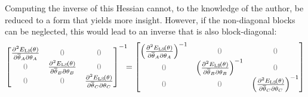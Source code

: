 \begin{remark}
Computing the inverse of this Hessian cannot, to the knowledge of the author, be reduced to a form that yields more insight.
However, if the non-diagonal blocks can be neglected, this would lead to an inverse that is also block-diagonal:
\begin{equation}
   \begin{bmatrix}
    \PartialDerivative[2]{\ELSCost{\theta}}{ \conj{\theta}_A \pd \theta_A } &
    \deemph{0} & 
    \deemph{0} \\
    \deemph{0} &
    \PartialDerivative[2]{\ELSCost{\theta}}{ \conj{\theta}_B \pd \theta_B } & 
    \deemph{0} \\
    \deemph{0} &
    \deemph{0} & 
    \PartialDerivative[2]{\ELSCost{\theta}}{ \conj{\theta}_C \pd \theta_C }
  \end{bmatrix}^{-1}
  \!\!\!=
  \begin{bmatrix}
    \left( \PartialDerivative[2]{\ELSCost{\theta}}{ \conj{\theta}_A \pd \theta_A }\right)^{-1} &
    \deemph{0} & 
    \deemph{0} \\
    \deemph{0} &
    \left( \PartialDerivative[2]{\ELSCost{\theta}}{ \conj{\theta}_B \pd \theta_B }\right)^{-1} & 
    \deemph{0} \\
    \deemph{0} &
    \deemph{0} & 
    \left( \PartialDerivative[2]{\ELSCost{\theta}}{ \conj{\theta}_C \pd \theta_C }\right)^{-1}
  \end{bmatrix}
\end{equation}
\end{remark}
